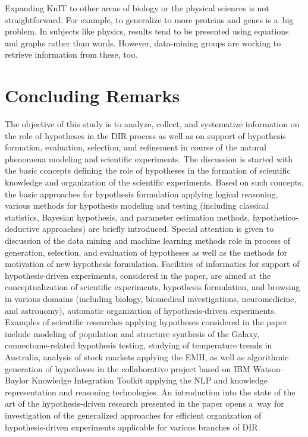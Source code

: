 \begin{multicols}{2}
  Expanding KnIT to other areas of biology or the physical sciences is not
straightforward. For example, to generalize to more proteins and genes is a~big
problem. In subjects like physics, results tend to be presented using equations and
graphs rather than words. However, data-mining groups are working to retrieve
information from these, too.

\vspace*{-6pt}

\section{Concluding Remarks}



\noindent
  The objective of this study is to analyze, collect, and systematize information on the
role of hypotheses in the DIR process as well as on support of
hypothesis formation, evaluation, selection, and refinement in course of the natural
phenomena modeling and scientific experiments. The discussion is started with the
basic concepts defining the role of hypotheses in the formation of scientific
knowledge and organization of the scientific experiments. Based on such concepts,
the basic approaches for hypothesis formulation applying logical reasoning, various
methods for hypothesis modeling and testing (including classical statistics, Bayesian
hypothesis, and parameter estimation methods, hypothetico-deductive approaches)
are briefly introduced. Special attention is given to discussion of the data mining and
machine learning methods role in process of generation, selection, and evaluation of
hypotheses as well as the methods for motivation of new hypothesis formulation.
Facilities of informatics for support of hypothesis-driven experiments, considered in
the paper, are aimed at the conceptualization of scientific experiments, hypothesis
formulation, and browsing in various domains (including biology, biomedical
investigations, neuromedicine, and astronomy), automatic organization of
hypothesis-driven   experiments. Examples of scientific researches applying hypotheses
considered in the paper include modeling of population and structure synthesis of the
Galaxy, connectome-related hypothesis testing,  studying of temperature trends in
Australia, analysis of stock markets applying the EMH,
as well as algorithmic generation of hypotheses in the collaborative project based on
IBM Watson--Baylor Knowledge Integration Toolkit applying the NLP and
knowledge representation and reasoning technologies. An introduction into the state
of the art of the hypothesis-driven research presented in the paper opens a~way for
investigation of the generalized approaches for efficient organization of
hypothesis-driven experiments applicable for various branches of DIR.


\end{multicols}

